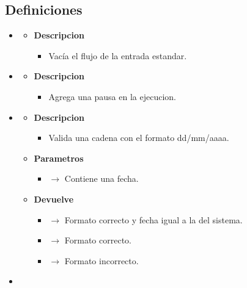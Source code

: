\subsection{Definiciones}
\begin{itemize}
     \item {}
    \begin{itemize}
        \item \textbf{Descripcion}
        \begin{itemize}
			\item Vacía el flujo de la entrada estandar.
		\end{itemize}
	\end{itemize}
    \item {}
   \begin{itemize}
       \item \textbf{Descripcion}
       \begin{itemize}
           \item Agrega una pausa en la ejecucion.
       \end{itemize}
   \end{itemize}
   \newpage
   \item {}
    \begin{itemize}
        \item \textbf{Descripcion}
        \begin{itemize}
			\item Valida una cadena con el formato dd/mm/aaaa.
		\end{itemize}
		\item \textbf{Parametros}
		\begin{itemize}
			\item {} $\rightarrow$ Contiene una fecha.
		\end{itemize}
        \item \textbf{Devuelve}
		\begin{itemize}
			\item {} $\rightarrow$ Formato correcto y fecha igual a la del sistema.
            \item {} $\rightarrow$ Formato correcto.
            \item {} $\rightarrow$ Formato incorrecto.
		\end{itemize}
	\end{itemize}
    \item {}
     \begin{itemize}

\end{itemize}
\end{itemize}
